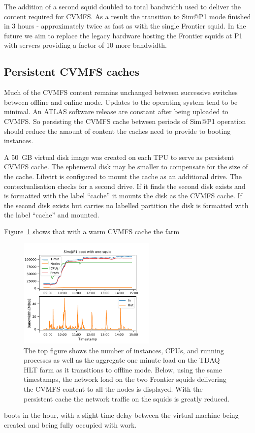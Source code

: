 \documentclass{webofc}
\begin{document}
The addition of a second squid doubled to total bandwidth used to deliver the
content required for CVMFS. As a result the transition to Sim@P1 mode finished
in 3 hours - approximately twice as fast as with the single Frontier squid. In
the future we aim to replace the legacy hardware hosting the Frontier squids at
P1 with servers providing a factor of 10 more bandwidth.


\subsection{Persistent CVMFS caches}
\label{sec:cvmfs}
Much of the CVMFS content remains unchanged between successive switches between
offline and online mode. Updates to the operating system tend to be minimal. An
ATLAS software release are constant after being uploaded to CVMFS. So
persisting the CVMFS cache between periods of Sim@P1 operation should reduce the
amount of content the caches need to provide to booting instances.

A $50$~\textrm{GB} virtual disk image was created on each TPU to serve as
persistent CVMFS cache. The ephemeral disk may be smaller to
compensate for the size of the cache. Libvirt is configured to mount the cache
as an additional drive. The contextualisation checks for a second drive. If it
finds the second disk exists and is formatted with the label ``cache'' it
mounts the disk as the CVMFS cache. If the second disk exists but carries no
labelled partition the disk is formatted with the label ``cache'' and mounted.

Figure~\ref{fig:persistent_cache} shows that with a warm CVMFS cache the farm
\begin{figure}[h]
\centering
\sidecaption
\includegraphics[width=0.6\textwidth,clip]{persistent_cache}
\caption{The top figure shows the number of instances, CPUs, and running
processes as well as the aggregate one minute load on the TDAQ HLT farm as it
transitions to offline mode. Below, using the same timestamps, the network load
on the two Frontier squids delivering the CVMFS content to all the nodes is
displayed. With the persistent cache the network traffic on the squids
is greatly reduced.}
\label{fig:persistent_cache}
\end{figure}
boots in the hour, with a slight time delay between the virtual machine being
created and being fully occupied with work.
\end{document}
